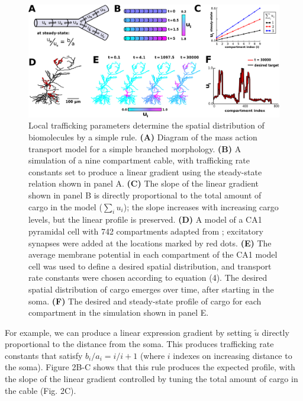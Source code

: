\documentclass[11pt]{wlpeerj}
\begin{document}
\begin{figure}[!tb]
\begin{center}
\includegraphics[width=0.9\columnwidth]{01_mass_action.png}
\caption{Local trafficking parameters determine the spatial distribution of biomolecules by a simple rule.
\textbf{(A)} Diagram of the mass action transport model for a simple branched morphology.
\textbf{(B)} A simulation of a nine compartment cable, with trafficking rate constants set to produce a linear gradient using the steady-state relation shown in panel A.
\textbf{(C)} The slope of the linear gradient shown in panel B is directly proportional to the total amount of cargo in the model ($\sum_i u_i$); the slope increases with increasing cargo levels, but the linear profile is preserved.
\textbf{(D)} A model of a CA1 pyramidal cell with 742 compartments adapted from \cite{Migliore_2012}; excitatory synapses were added at the locations marked by red dots. 
\textbf{(E)} The average membrane potential in each compartment of the CA1 model cell was used to define a desired spatial distribution, and transport rate constants were chosen according to equation (4). The desired spatial distribution of cargo emerges over time, after starting in the soma.
\textbf{(F)} The desired and steady-state profile of cargo for each compartment in the simulation shown in panel E.
}
\end{center}
\end{figure}

For example, we can produce a linear expression gradient \citep{Magee_1998,Hoffman_1997} by setting $\tilde{u}$ directly proportional to the distance from the soma.
This produces trafficking rate constants that satisfy $b_i / a_i = i / i + 1$ (where $i$ indexes on increasing distance to the soma).
Figure 2B-C shows that this rule produces the expected profile, with the slope of the linear gradient controlled by tuning the total amount of cargo in the cable (Fig. 2C).
\end{document}
